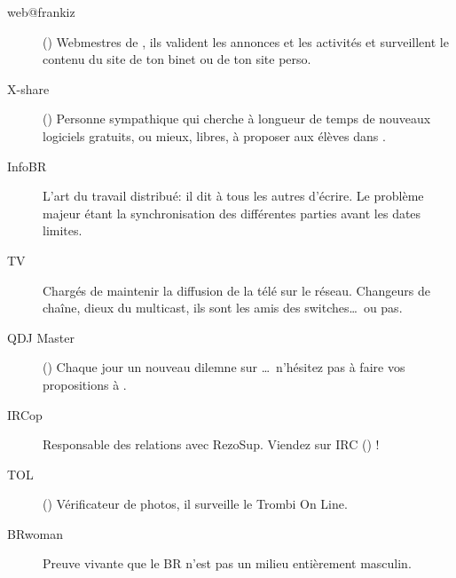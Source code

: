 \begin{description}
  \item[web@frankiz] {() Webmestres de \fkz, ils valident les annonces et les activit\'es et surveillent le contenu du site de ton binet ou de ton site perso.}

  \item[X-share] {() Personne sympathique qui cherche \`a longueur de temps de nouveaux logiciels gratuits, ou mieux, libres, \`a proposer aux \'el\`eves dans \xshare.}

  \item[InfoBR]{L'art du travail distribu\'e: il dit \`a tous les autres d'\'ecrire. Le probl\`eme majeur \'etant la synchronisation des diff\'erentes parties avant les dates limites.}

  \item[TV]{Charg\'es de maintenir la diffusion de la t\'el\'e sur le r\'eseau. Changeurs de cha\^ine, dieux du multicast, ils sont les amis des switches\dots\ ou pas.}

  \item[QDJ Master] {() Chaque jour un nouveau dilemne sur \fkz\dots\ n'h\'esitez pas \`a faire vos propositions \`a .}

  \item[IRCop]{Responsable des relations avec RezoSup. Viendez sur IRC () !}

  \item[TOL] {() V\'erificateur de photos, il surveille le Trombi On Line.}

  \item[BRwoman]{Preuve vivante que le BR n'est pas un milieu enti\`erement masculin.}

\end{description}
